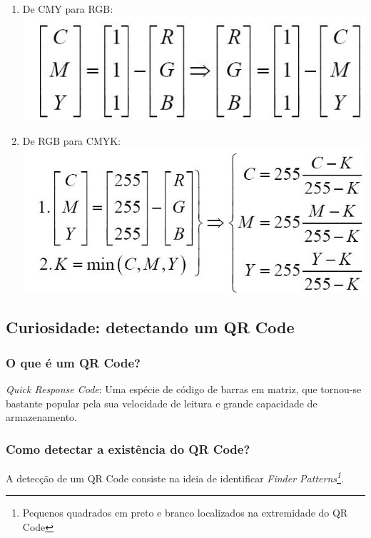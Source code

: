 \documentclass{article}
\begin{document}
            \begin{enumerate}
            
            \item De CMY para RGB: 
            \includegraphics[scale=0.4]{CMYparaRGB.jpg}
            
            \item De RGB para CMYK:
            \includegraphics[scale=0.4]{RGBparaCMYK.jpg}
            
            \end{enumerate}
        
        \subsection{Curiosidade: detectando um QR Code}
            \subsubsection{O que é um QR Code?}
            {\it Quick Response Code}: Uma espécie de código de barras em matriz, que tornou-se bastante popular pela sua velocidade de leitura e grande capacidade de armazenamento.
            
            \subsubsection{Como detectar a existência do QR Code?}
            A detecção de um QR Code consiste na ideia de identificar {\it Finder Patterns\footnote{Pequenos quadrados em preto e branco localizados na extremidade do QR Code}}.
            
\end{document}
